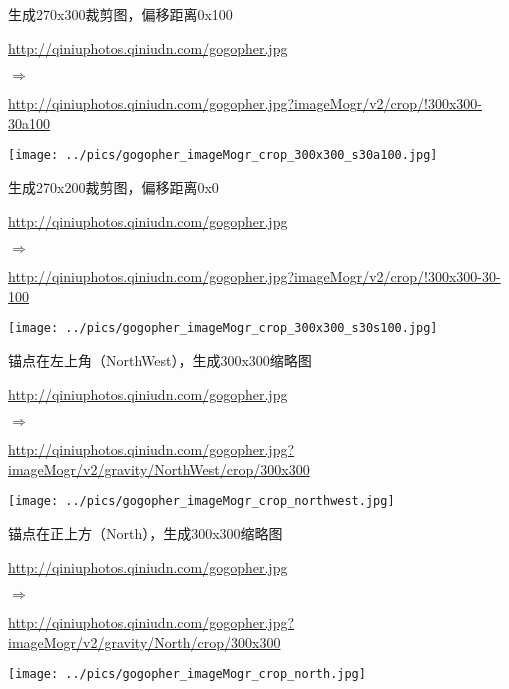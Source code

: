 \documentclass[11pt, oneside]{book}
\newcommand{\qpar}[1]{
\vspace{0.25em}
\noindent
#1\par
\vspace{0.25em}
}
\newcommand{\qurl}[1]{\footnotesize\url{#1}\normalsize}
\begin{document}
\begin{CJK*}{UTF8}{song}
\begin{sample}
  \caption{生成270x300裁剪图，偏移距离0x100}
    \qpar{\qurl{http://qiniuphotos.qiniudn.com/gogopher.jpg}}
    \qpar{$\Rightarrow$}
    \qpar{\qurl{http://qiniuphotos.qiniudn.com/gogopher.jpg?imageMogr/v2/crop/!300x300-30a100}}

    \begin{center}
      \texttt{[image: ../pics/gogopher\_imageMogr\_crop\_300x300\_s30a100.jpg]}
    \end{center}
  \label{imageMogr-crop-300x300-s30a100}
\end{sample}

\begin{sample}
  \caption{生成270x200裁剪图，偏移距离0x0}
    \qpar{\qurl{http://qiniuphotos.qiniudn.com/gogopher.jpg}}
    \qpar{$\Rightarrow$}
    \qpar{\qurl{http://qiniuphotos.qiniudn.com/gogopher.jpg?imageMogr/v2/crop/!300x300-30-100}}

    \begin{center}
      \texttt{[image: ../pics/gogopher\_imageMogr\_crop\_300x300\_s30s100.jpg]}
    \end{center}
  \label{imageMogr-crop-300x300-s30s100}
\end{sample}

\begin{sample}
  \caption{锚点在左上角（NorthWest），生成300x300缩略图}
    \qpar{\qurl{http://qiniuphotos.qiniudn.com/gogopher.jpg}}
    \qpar{$\Rightarrow$}
    \qpar{\qurl{http://qiniuphotos.qiniudn.com/gogopher.jpg?imageMogr/v2/gravity/NorthWest/crop/300x300}}

    \begin{center}
      \texttt{[image: ../pics/gogopher\_imageMogr\_crop\_northwest.jpg]}
    \end{center}
  \label{imageMogr-crop-northwest}
\end{sample}

\begin{sample}
  \caption{锚点在正上方（North），生成300x300缩略图}
    \qpar{\qurl{http://qiniuphotos.qiniudn.com/gogopher.jpg}}
    \qpar{$\Rightarrow$}
    \qpar{\qurl{http://qiniuphotos.qiniudn.com/gogopher.jpg?imageMogr/v2/gravity/North/crop/300x300}}

    \begin{center}
      \texttt{[image: ../pics/gogopher\_imageMogr\_crop\_north.jpg]}
    \end{center}
  \label{imageMogr-crop-north}
\end{sample}


\end{CJK*}
\end{document}
